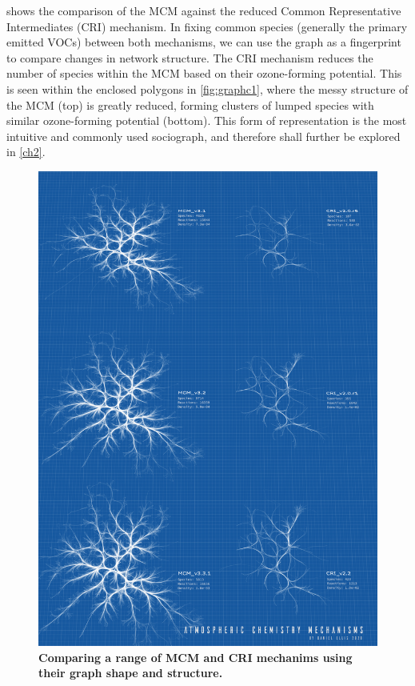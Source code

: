  shows the comparison of the MCM against the reduced Common Representative Intermediates (CRI) \citep{cri} mechanism. In fixing common species (generally the primary emitted VOCs) between both mechanisms, we can use the graph as a fingerprint to compare changes in network structure. The CRI mechanism reduces the number of species within the MCM based on their ozone-forming potential. This is seen within the enclosed polygons in \autoref{fig:graphc1}, where the messy structure of the MCM (top) is greatly reduced, forming clusters of lumped species with similar ozone-forming potential (bottom). This form of representation is the most intuitive and commonly used sociograph, and therefore shall further be explored in \autoref{ch2}.



\begin{figure}[H]
     \centering
         \includegraphics[width=1.1\textwidth]{poster.png}
        \caption{\textbf{Comparing a range of MCM and CRI mechanims using their graph shape and structure.} }
        \label{fig:graphc1}
\end{figure}


